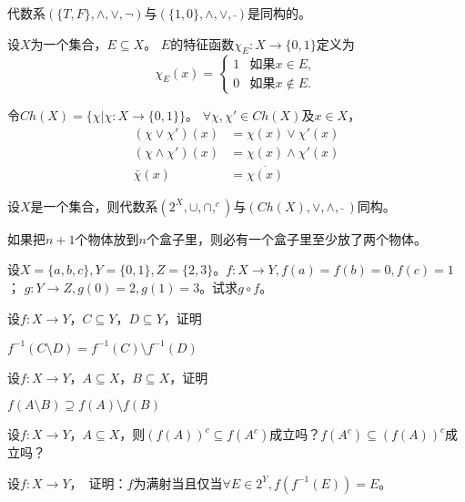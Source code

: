 代数系$(\{T,F\},\land,\lor,\lnot)$与$(\{1,0\},\land, \lor,\bar{ })$是同构的。
  \begin{Def}
    设$X$为一个集合，$E \subseteq X$。 $E$的特征函数$\chi_E:X\to \{0,1\}$定义为
    \begin{equation*}
      \chi_E(x)=
      \begin{cases}
        1 & \text{如果} x \in E,\\
        0 & \text{如果} x \notin E.
      \end{cases}
    \end{equation*}
  \end{Def}
  \begin{Def}
    令$Ch(X) = \{\chi |\chi:X \to \{0,1\}\}$。
    $\forall \chi, \chi' \in Ch(X)$及$x \in X$，
    \begin{align}
      (\chi \lor \chi')(x) &= \chi(x) \lor \chi'(x)\nonumber\\
      (\chi \land \chi')(x) &= \chi(x) \land \chi'(x)\nonumber\\
      \bar{\chi}(x) &=   \overline{\chi(x)}
    \end{align}
  \end{Def}
  \begin{Thm}
    设$X$是一个集合，则代数系$(2^X, \cup, \cap, ^c)$与$(Ch(X), \lor, \land, \bar{} \ )$同构。
  \end{Thm}

  \begin{Thm}[鸽笼原理]
    如果把$n+1$个物体放到$n$个盒子里，则必有一个盒子里至少放了两个物体。
  \end{Thm}
  

    \begin{Exercise}
  设$X=\{a,b,c\}, Y=\{0,1\}, Z=\{2,3\}$。$f:X \to Y, f(a) = f(b) = 0, f(c) = 1$；
  $g:Y\to Z, g(0) = 2, g(1) = 3$。试求$g\circ f$。
  \end{Exercise}
  \begin{Exercise}
    设$f:X \to Y$，$C \subseteq Y$，$D \subseteq Y$，证明

    $f^{-1}(C \setminus D) = f^{-1}(C) \setminus f^{-1}(D)$
  \end{Exercise}
    \begin{Exercise}
    设$f:X \to Y$，$A \subseteq X$，$B \subseteq X$，证明

    $f(A \setminus B) \supseteq f(A) \setminus f(B)$
    
  \end{Exercise}
  \begin{Exercise}
    设$f:X\to Y$，$A \subseteq X$，则$(f(A))^c \subseteq f(A^c)$成立吗？$ f(A^c)\subseteq (f(A))^c$成立吗？
  \end{Exercise}
  \begin{Exercise}
    设$f:X\to Y$，　证明：$f$为满射当且仅当$\forall E \in 2^Y, f(f^{-1}(E)) = E$。
  \end{Exercise}

